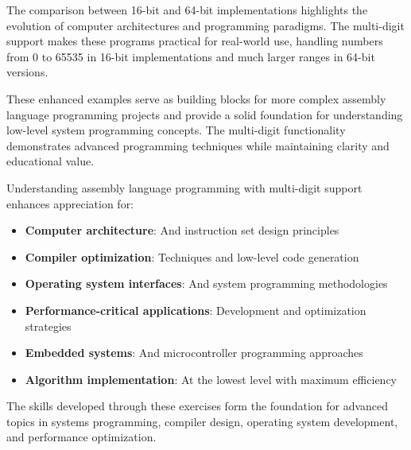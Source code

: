 \documentclass[12pt,a4paper]{article}
\begin{document}
The comparison between 16-bit and 64-bit implementations highlights the evolution of computer architectures and programming paradigms. The multi-digit support makes these programs practical for real-world use, handling numbers from 0 to 65535 in 16-bit implementations and much larger ranges in 64-bit versions.

These enhanced examples serve as building blocks for more complex assembly language programming projects and provide a solid foundation for understanding low-level system programming concepts. The multi-digit functionality demonstrates advanced programming techniques while maintaining clarity and educational value.

Understanding assembly language programming with multi-digit support enhances appreciation for:

\begin{itemize}
\item \textbf{Computer architecture}: And instruction set design principles
\item \textbf{Compiler optimization}: Techniques and low-level code generation
\item \textbf{Operating system interfaces}: And system programming methodologies
\item \textbf{Performance-critical applications}: Development and optimization strategies
\item \textbf{Embedded systems}: And microcontroller programming approaches
\item \textbf{Algorithm implementation}: At the lowest level with maximum efficiency
\end{itemize}

The skills developed through these exercises form the foundation for advanced topics in systems programming, compiler design, operating system development, and performance optimization.
\end{document}
